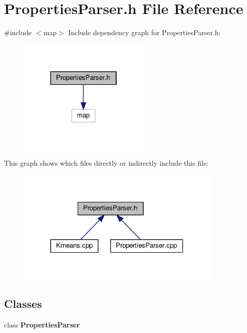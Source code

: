 \section{Properties\+Parser.\+h File Reference}
\label{_properties_parser_8h}
{\ttfamily \#include $<$map$>$}\newline
Include dependency graph for Properties\+Parser.\+h\+:
\nopagebreak
\begin{figure}[H]
\begin{center}
\leavevmode
\includegraphics[width=178pt]{_properties_parser_8h__incl}
\end{center}
\end{figure}
This graph shows which files directly or indirectly include this file\+:
\nopagebreak
\begin{figure}[H]
\begin{center}
\leavevmode
\includegraphics[width=278pt]{_properties_parser_8h__dep__incl}
\end{center}
\end{figure}
\subsection*{Classes}
\begin{DoxyCompactItemize}
\item 
class \textbf{ Properties\+Parser}
\end{DoxyCompactItemize}
